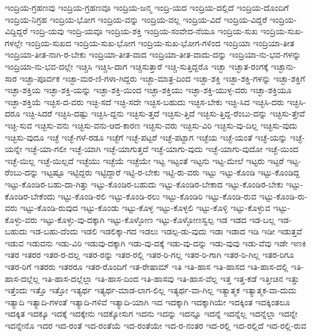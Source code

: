 {ಇಂದ್ರಿಯ-ಗ್ರಹಣವು
ಇಂದ್ರಿಯ-ಗ್ರಹಣವೂ
ಇಂದ್ರಿಯ-ಜನ್ಮ
ಇಂದ್ರಿ-ಯದ
ಇಂದ್ರಿಯ-ದಲ್ಲಿದೆ
ಇಂದ್ರಿಯ-ದೊಂದಿಗೆ
ಇಂದ್ರಿಯ-ನಿಗ್ರಹ
ಇಂದ್ರಿಯ-ಭೋಗ
ಇಂದ್ರಿಯ-ವನ್ನು
ಇಂದ್ರಿಯ-ವಲ್ಲ
ಇಂದ್ರಿಯ-ವಿದೆ
ಇಂದ್ರಿಯ-ವಿದ್ದರೆ
ಇಂದ್ರಿಯ-ವಿದ್ದಿದ್ದರೆ
ಇಂದ್ರಿ-ಯವು
ಇಂದ್ರಿ-ಯವೂ
ಇಂದ್ರಿಯ-ಶಕ್ತಿ
ಇಂದ್ರಿಯ-ಸಂವೇದ-ನೆಯೂ
ಇಂದ್ರಿಯ-ಸುಖ
ಇಂದ್ರಿಯ-ಸುಖ-ಗಳಲ್ಲೇ
ಇಂದ್ರಿಯ-ಸುಖದ
ಇಂದ್ರಿಯ-ಸುಖ-ಭೋಗ
ಇಂದ್ರಿಯ-ಸುಖ-ಭೋಗ-ಗಳಿಂದ
ಇಂದ್ರಿಯಾ
ಇಂದ್ರಿಯಾ-ತೀತ
ಇಂದ್ರಿಯಾ-ತೀತ-ನಾಗಿ-ರ-ಬೇಕು
ಇಂದ್ರಿಯಾ-ತೀತ-ವಾದ
ಇಂದ್ರಿಯಾ-ತೀತ-ವಾದು-ದನ್ನು
ಇಂದ್ರಿಯಾ-ನು-ಭವ-ಗಳನ್ನು
ಇಂದ್ರಿಯಾ-ನು-ಭವ-ದಲ್ಲೇ
ಇಚ್ಚಿಸಿ
ಇಚ್ಚಿಸಿ-ದಾಗ
ಇಚ್ಚಿಸುತ್ತಾರೆ
ಇಚ್ಚಿ-ಸುತ್ತಿದ್ದರೊ
ಇಚ್ಛಾ
ಇಚ್ಛಾತ-ರಂಗಕ್ಕೆ
ಇಚ್ಛಾನು-ಸಾರ
ಇಚ್ಛಾ-ಪೂರ್ವಕ
ಇಚ್ಛಾ-ಮರ-ಣಿ-ಗಳಾ-ಗಿದ್ದರು
ಇಚ್ಛಾ-ಮಾತ್ರ-ದಿಂದ
ಇಚ್ಛಾ-ಶಕ್ತಿ
ಇಚ್ಛಾ-ಶಕ್ತಿ-ಗಳನ್ನು
ಇಚ್ಛಾ-ಶಕ್ತಿಗೆ
ಇಚ್ಛಾ-ಶಕ್ತಿಯ
ಇಚ್ಛಾ-ಶಕ್ತಿ-ಯನ್ನು
ಇಚ್ಛಾ-ಶಕ್ತಿ-ಯಿಂದ
ಇಚ್ಛಾ-ಶಕ್ತಿಯು
ಇಚ್ಛಾ-ಶಕ್ತಿ-ಯುಳ್ಳ-ವರು
ಇಚ್ಛಾ-ಶಕ್ತಿಯೂ
ಇಚ್ಛಾ-ಶಕ್ತಿಯೆ
ಇಚ್ಛಿಸ-ದ-ವರು
ಇಚ್ಛಿ-ಸದೆ
ಇಚ್ಛಿ-ಸದೇ
ಇಚ್ಛಿಸ-ಬಹುದು
ಇಚ್ಛಿಸ-ಬೇಕು
ಇಚ್ಛಿ-ಸಿದ
ಇಚ್ಛಿಸಿ-ದರು
ಇಚ್ಛಿಸಿ-ದರೂ
ಇಚ್ಛಿ-ಸಿದರೆ
ಇಚ್ಛಿಸಿ-ದಷ್ಟು
ಇಚ್ಛಿಸಿ-ದ್ದನು
ಇಚ್ಛಿಸು-ತ್ತದೆ
ಇಚ್ಛಿಸು-ತ್ತಿದೆ
ಇಚ್ಛಿಸು-ತ್ತಿದ್ದ-ರೆಂಬು-ದನ್ನು
ಇಚ್ಛಿಸು-ತ್ತೇವೆ
ಇಚ್ಛಿ-ಸುವ
ಇಚ್ಛಿಸು-ವನು
ಇಚ್ಛಿಸು-ವನು-ಆದ-ಕಾರಣ
ಇಚ್ಛಿಸು-ವರು
ಇಚ್ಛಿಸು-ವಿರಿ
ಇಚ್ಛಿಸು-ವು-ದಿಲ್ಲ
ಇಚ್ಛಿಸು-ವುದು
ಇಚ್ಛಿಸು-ವುದೂ
ಇಚ್ಛೆ
ಇಚ್ಛೆ-ಗಳೆ-ರಡೂ
ಇಚ್ಛೆಗೆ
ಇಚ್ಛೆ-ಪಟ್ಟರೆ
ಇಚ್ಛೆ-ಪಟ್ಟಾಗ
ಇಚ್ಛೆಯ
ಇಚ್ಛೆ-ಯಂತೆ
ಇಚ್ಛೆ-ಯನ್ನು
ಇಚ್ಛೆ-ಯನ್ನೇ
ಇಚ್ಛೆ-ಯಾ-ಗಲೀ
ಇಚ್ಛೆ-ಯಾಗಿ
ಇಚ್ಛೆ-ಯಾಗುತ್ತದೆ
ಇಚ್ಛೆ-ಯಾಗು-ವುದು
ಇಚ್ಛೆ-ಯಾಗು-ವುದೋ
ಇಚ್ಛೆ-ಯಿಂದ
ಇಚ್ಛೆ-ಯಿಲ್ಲ
ಇಚ್ಛೆ-ಯಿಲ್ಲದೆ
ಇಚ್ಛೆಯು
ಇಚ್ಛೆಯೆ
ಇಚ್ಛೆಯೇ
ಇಟ್ಟ
ಇಟ್ಟಂತೆ
ಇಟ್ಟನು
ಇಟ್ಟ-ಮೇಲೆ
ಇಟ್ಟರು
ಇಟ್ಟರೆ
ಇಟ್ಟ-ರೆಂಬು-ದನ್ನು
ಇಟ್ಟಷ್ಟೂ
ಇಟ್ಟಿದ್ದರು
ಇಟ್ಟಿದ್ದಾರೆ
ಇಟ್ಟಿ-ರ-ಬೇಕು
ಇಟ್ಟಿ-ರು-ವರು
ಇಟ್ಟು
ಇಟ್ಟು-ಕೊಂಡಿ
ಇಟ್ಟು-ಕೊಂಡಿದ್ದ
ಇಟ್ಟು-ಕೊಂಡಿರ-ಬಹು-ದಾ-ಗಿತ್ತು
ಇಟ್ಟು-ಕೊಂಡಿರ-ಬಹುದು
ಇಟ್ಟು-ಕೊಂಡಿರ-ಬೇಕಾದ
ಇಟ್ಟು-ಕೊಂಡಿರ-ಬೇಕು
ಇಟ್ಟು-ಕೊಂಡಿರ-ಬೇಕೆಂದು
ಇಟ್ಟು-ಕೊಂಡಿ-ರಲಿ
ಇಟ್ಟು-ಕೊಂಡಿ-ರಲು
ಇಟ್ಟು-ಕೊಂಡಿರಿ
ಇಟ್ಟು-ಕೊಂಡಿ-ರುವ
ಇಟ್ಟು-ಕೊಂಡಿ-ರು-ವರು
ಇಟ್ಟು-ಕೊಂಡಿ-ರುವುದ
ಇಟ್ಟು-ಕೊಂಡು
ಇಟ್ಟು-ಕೊಳ್ಳ
ಇಟ್ಟು-ಕೊಳ್ಳಲಿ
ಇಟ್ಟು-ಕೊಳ್ಳಿ
ಇಟ್ಟು-ಕೊಳ್ಳುವ
ಇಟ್ಟು-ಕೊಳ್ಳು-ವರು
ಇಟ್ಟು-ಕೊಳ್ಳು-ವು-ದಕ್ಕಾಗಿ
ಇಟ್ಟು-ಕೊಳ್ಳೋಣ
ಇಟ್ಟು-ಕೊಳ್ಳೋಣಸ್ವಲ್ಪ
ಇಡ
ಇಡದ
ಇಡ-ಬಲ್ಲ
ಇಡ-ಬಹುದು
ಇಡ-ಬಹು-ದೆಂದು
ಇಡಲಿ
ಇಡಲಿಕ್ಕಾ-ಗದ
ಇಡಲು
ಇಡಲ್ಪ-ಡು-ವುದು
ಇಡಾ
ಇಡಾದ
ಇಡಿ
ಇಡೀ
ಇಡುತ್ತವೆ
ಇಡುವ
ಇಡುವನು
ಇಡು-ವಿರಿ
ಇಡುವು-ದಕ್ಕಾಗಿ
ಇಡು-ವು-ದಕ್ಕೆ
ಇಡು-ವು-ದನ್ನು
ಇಡು-ವುವು
ಇಡು-ವೆವು
ಇಡೇ
ಇಣಕಿ
ಇತರ
ಇತರರ
ಇತರ-ರ-ದಲ್ಲ
ಇತರ-ರನ್ನು
ಇತರ-ರಲ್ಲಿ
ಇತರ-ರಿ-ಗಲ್ಲ
ಇತರ-ರಿ-ಗಾಗಿ
ಇತರ-ರಿ-ಗಿಲ್ಲ
ಇತರ-ರಿಗೂ
ಇತರ-ರಿಗೆ
ಇತರರು
ಇತರರೂ
ಇತರ-ರೊಂದಿಗೆ
ಇತ-ರೇಷಾಮ್
ಇತಿ
ಇತಿ-ಹಾಸ
ಇತಿ-ಹಾಸದ
ಇತಿ-ಹಾಸ-ದಲ್ಲಿ
ಇತಿ-ಹಾಸ-ದಲ್ಲೆಲ್ಲ
ಇತಿ-ಹಾಸ-ದಲ್ಲೆಲ್ಲಾ
ಇತಿ-ಹಾಸ-ದಿಂದ
ಇತಿ-ಹಾಸವು
ಇತಿ-ಹಾಸ-ವೆಲ್ಲ
ಇತ್ತ
ಇತ್ತ-ಕಡೆ
ಇತ್ತೀಚಿನ
ಇತ್ತು
ಇತ್ತೆಂದು
ಇತ್ತೊ
ಇತ್ತೋ
ಇತ್ಯರ್ಥ
ಇತ್ಯರ್ಥ-ಮಾಡ-ಲಾಗ-ಲಿಲ್ಲ
ಇತ್ಯರ್ಥ-ವಾ-ಗಿಲ್ಲ
ಇತ್ಯಾತ್ಮಕ
ಇತ್ಯಾತ್ಮಕ-ವಾ-ದುದು
ಇತ್ಯಾದಿ
ಇತ್ಯಾದಿ-ಗಳಂತೆ
ಇತ್ಯಾದಿ-ಗಳಿವೆ
ಇತ್ಯಾದಿ-ಯಾಗಿ
ಇದ
ಇದಕ್ಕಾಗಿ
ಇದಕ್ಕಾಗಿಯೇ
ಇದಕ್ಕಿಂತ
ಇದಕ್ಕಿಂತಲೂ
ಇದಕ್ಕಿತ
ಇದಕ್ಕೂ
ಇದಕ್ಕೆ
ಇದಕ್ಕೇನು
ಇದಕ್ಕೋಸುಗ
ಇದನು
ಇದನ್ನು
ಇದನ್ನೂ
ಇದನ್ನೆ
ಇದನ್ನೆಲ್ಲ
ಇದನ್ನೆಲ್ಲಾ
ಇದನ್ನೇ
ಇದನ್ನೇನೊ
ಇದರ
ಇದ-ರಂತೆ
ಇದ-ರಂತೆಯೆ
ಇದ-ರಂತೆಯೇ
ಇದ-ರ-ನಂತರ
ಇದ-ರಲ್ಲಿ
ಇದ-ರಲ್ಲಿದೆ
ಇದ-ರಲ್ಲಿ-ರುವ
}
